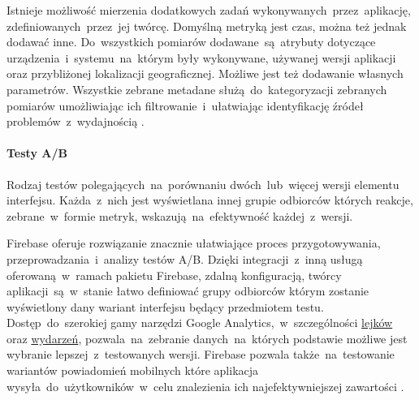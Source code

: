 Istnieje możliwość mierzenia dodatkowych zadań wykonywanych~przez~aplikację, zdefiniowanych~przez~jej twórcę. Domyślną metryką jest czas, można też jednak dodawać inne. Do~wszystkich pomiarów dodawane~są~atrybuty dotyczące urządzenia~i~systemu~na~którym były wykonywane, używanej wersji aplikacji oraz przybliżonej lokalizacji geograficznej. Możliwe jest też dodawanie własnych parametrów. Wszystkie zebrane metadane służą~do~kategoryzacji zebranych pomiarów umożliwiając ich  filtrowanie~i~ułatwiając identyfikację źródeł problemów~z~wydajnością \cite{Fb_Pref_Monitor}.

\paragraph{Testy A/B}
Rodzaj testów polegających~na~porównaniu dwóch~lub~więcej wersji elementu interfejsu. Każda~z~nich jest wyświetlana innej grupie odbiorców których reakcje, zebrane~w~formie metryk, wskazują~na~efektywność każdej~z~wersji. 

Firebase oferuje rozwiązanie znacznie ułatwiające proces przygotowywania, przeprowadzania~i~analizy testów A/B. Dzięki integracji~z~inną usługą oferowaną~w~ramach pakietu Firebase, zdalną konfiguracją, twórcy aplikacji~są~w~stanie łatwo definiować grupy odbiorców którym zostanie wyświetlony dany wariant interfejsu będący przedmiotem testu. Dostęp~do~szerokiej gamy narzędzi Google Analytics,~w~szczególności \hyperref[par:ga-funnels]{lejków} oraz  \hyperref[par:ga-events]{wydarzeń}, pozwala~na~zebranie danych~na~których podstawie możliwe jest wybranie lepszej~z~testowanych wersji. Firebase pozwala także~na~testowanie wariantów powiadomień mobilnych które aplikacja wysyła~do~użytkowników~w~celu znalezienia ich najefektywniejszej zawartości \cite{Fb_AB_Testing}.
